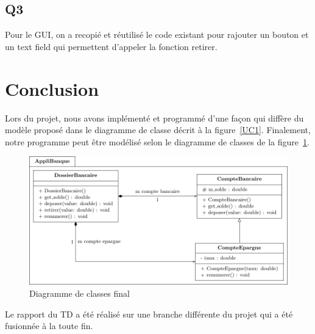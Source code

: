 \documentclass[12pt]{article}
\begin{document}
\subsection{Q3}

Pour le GUI, on a recopié et réutilisé le code existant pour rajouter un bouton et un text field qui permettent d'appeler la fonction retirer.

\section{Conclusion}

Lors du projet, nous avons implémenté et programmé d'une façon qui diffère du modèle proposé dans le diagramme de classe décrit à la figure~\ref{UC1}.
Finalement, notre programme peut être modélisé selon le diagramme de classes de la figure~\ref{UC2}.

\begin{figure}[h]
    \centering
    \includegraphics{Diagrammes/UML_UC2.pdf}
    \caption{Diagramme de classes final\label{UC2}}
\end{figure}

Le rapport du TD a été réalisé sur une branche différente du projet qui a été fusionnée à la toute fin.
\end{document}
